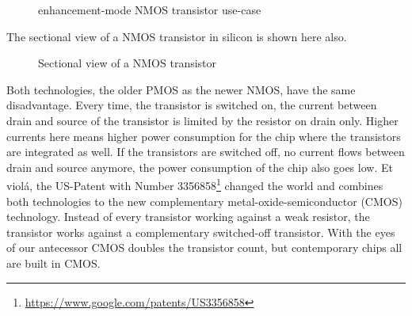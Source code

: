 \documentclass[10pt,a4paper,oneside]{article}
\newcounter{ct}
\begin{document}
\begin{figure}[H]
	\centering
	\begin{circuitdiagram}{20}{20}
	\end{circuitdiagram}
	\caption{enhancement-mode NMOS transistor use-case}
\end{figure}

The sectional view of a NMOS transistor in silicon is shown here also.
\begin{figure}[H]
	\centering
	\begin{tikzpicture}[node distance = 3cm, auto, thick,scale=0.5, every node/.style={transform shape}]
		
	\end{tikzpicture}
	\caption{Sectional view of a NMOS transistor}
\end{figure}

Both technologies, the older PMOS as the newer NMOS, have the same disadvantage. Every time, the transistor is switched on, the current between drain and source of the transistor is limited by the resistor on drain only. Higher currents here means higher power consumption for the chip where the transistors are integrated as well. If the transistors are switched off, no current flows between drain and source anymore, the power consumption of the chip also goes low.
Et viol\'{a}, the US-Patent with Number 3356858\footnote{\url{https://www.google.com/patents/US3356858}} changed the world and combines both technologies to the new complementary metal-oxide-semiconductor (CMOS) technology. Instead of every transistor working against a weak resistor, the transistor works against a complementary switched-off transistor. With the eyes of our antecessor CMOS doubles the transistor count, but contemporary chips all are built in CMOS.
\end{document}
